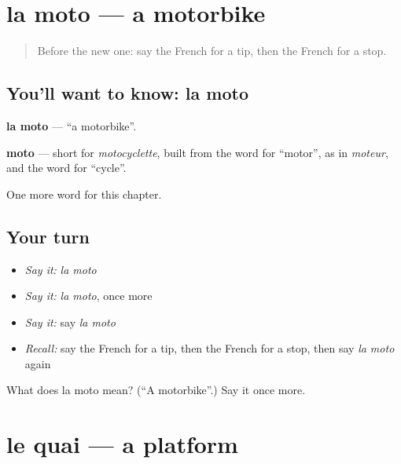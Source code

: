 \section[la moto]{la moto — a motorbike}

\label{lesson:FR-C247-moto}



\begin{quote}
Before the new one: say the French for a tip, then the French for a stop.
\end{quote}

\subsection*{You'll want to know: la moto}
\textbf{la moto} — \textquotedblleft{}a motorbike\textquotedblright{}.

\begin{cousinweb}
\textbf{moto} — short for \emph{motocyclette}, built from the word for \textquotedblleft{}motor\textquotedblright{}, as in \emph{moteur}, and the word for \textquotedblleft{}cycle\textquotedblright{}.
\end{cousinweb}

\begin{grammarlens}[title={What you've built}]
One more word for this chapter.
\end{grammarlens}

\subsection*{Your turn}
\begin{itemize}
\raggedright
  \item \emph{Say it:} \emph{la moto}
  \item \emph{Say it:} \emph{la moto}, once more
  \item \emph{Say it:} say \emph{la moto}
  \item \emph{Recall:} say the French for a tip, then the French for a stop, then say \emph{la moto} again
\end{itemize}

\begin{tcolorbox}[breakable,colback=teal!4,colframe=teal!35!black,title={Before you move on}]
What does la moto mean? (\textquotedblleft{}A motorbike\textquotedblright{}.) Say it once more.
\end{tcolorbox}
\section[le quai]{le quai — a platform}


